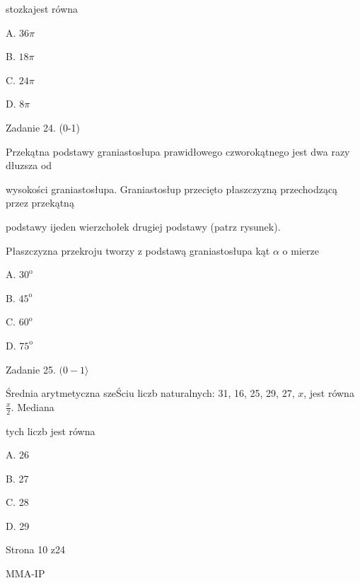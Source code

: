 \documentclass[a4paper,12pt]{article}
\begin{document}
stozkajest równa

A. $ 36\pi$

B. $ 18\pi$

C. $ 24\pi$

D. $ 8\pi$

Zadanie 24. (0-1)

Przekątna podstawy graniastosłupa prawidłowego czworokątnego jest dwa razy dłuzsza od

wysokości graniastosłupa. Graniastosłup przecięto płaszczyzną przechodzącą przez przekątną

podstawy ijeden wierzchołek drugiej podstawy (patrz rysunek).

Płaszczyzna przekroju tworzy z podstawą graniastosłupa kąt $\alpha$ o mierze

A. $30^{\mathrm{o}}$

B. $45^{\mathrm{o}}$

C. $60^{\mathrm{o}}$

D. $75^{\mathrm{o}}$

Zadanie 25. $(0-1\rangle$

Średnia arytmetyczna szeŚciu liczb naturalnych: 31, 16, 25, 29, 27, $x$, jest równa $\displaystyle \frac{x}{2}$. Mediana

tych liczb jest równa

A. 26

B. 27

C. 28

D. 29

Strona 10 z24

MMA-IP
\end{document}
